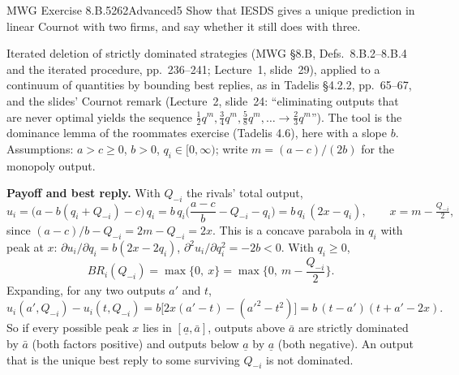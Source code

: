 \begin{exsol}{MWG Exercise 8.B.5}{262}{Advanced}{5}
\asked Show that IESDS gives a unique prediction in linear Cournot with two firms, and say whether
it still does with three.

\method Iterated deletion of strictly dominated strategies (MWG \S8.B, Defs.~8.B.2--8.B.4 and the
iterated procedure, pp.~236--241; Lecture~1, slide~29), applied to a continuum of quantities by
bounding best replies, as in Tadelis \S4.2.2, pp.~65--67, and the slides' Cournot remark
(Lecture~2, slide~24: ``eliminating outputs that are never optimal yields the sequence
$\tfrac12 q^m, \tfrac34 q^m, \tfrac58 q^m, \dots \to \tfrac23 q^m$''). The tool is the dominance
lemma of the roommates exercise (Tadelis 4.6), here with a slope $b$. Assumptions: $a > c \ge 0$,
$b > 0$, $q_i \in [0, \infty)$; write $m = (a-c)/(2b)$ for the monopoly output.

\solution
\textbf{Payoff and best reply.} With $Q_{-i}$ the rivals' total output,
\[
  u_i = \big(a - b(q_i + Q_{-i}) - c\big)\, q_i
      = b\,q_i\Big(\frac{a-c}{b} - Q_{-i} - q_i\Big)
      = b\, q_i\,(2x - q_i), \qquad x = m - \tfrac{Q_{-i}}{2},
\]
since $(a-c)/b - Q_{-i} = 2m - Q_{-i} = 2x$. This is a concave parabola in $q_i$ with peak at $x$:
$\partial u_i/\partial q_i = b(2x - 2q_i)$, $\partial^2 u_i/\partial q_i^2 = -2b < 0$. With
$q_i \ge 0$,
\[
  BR_i(Q_{-i}) = \max\{0,\ x\} = \max\Big\{0,\ m - \frac{Q_{-i}}{2}\Big\}.
\]
Expanding, for any two outputs $a'$ and $t$,
\[
  u_i(a', Q_{-i}) - u_i(t, Q_{-i}) = b\big[2x(a' - t) - (a'^2 - t^2)\big]
  = b\,(t - a')(t + a' - 2x). \tag{1}
\]
So if every possible peak $x$ lies in $[\underline a, \bar a]$, outputs above $\bar a$ are
strictly dominated by $\bar a$ (both factors positive) and outputs below $\underline a$ by
$\underline a$ (both negative). An output that is the unique best reply to some surviving
$Q_{-i}$ is not dominated.


\end{exsol}
